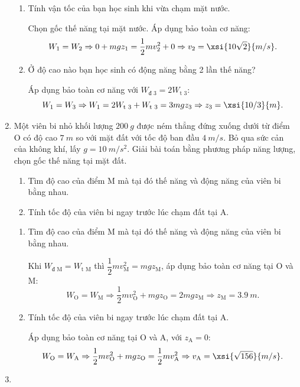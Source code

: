 \begin{enumerate}[label=\bfseries Câu \arabic*:]
	\hideall
	{	
			\begin{enumerate}[label=\alph*)]
			\item Tính vận tốc của bạn học sinh khi vừa chạm mặt nước.
			
			Chọn gốc thế năng tại mặt nước. Áp dụng bảo toàn cơ năng:
			$$W_1 = W_2 \Rightarrow 0 + mgz_1 = \dfrac{1}{2}mv_2^2 + 0 \Rightarrow v_2 = \xsi{10\sqrt 2}{m/s}.$$
			\item Ở độ cao nào bạn học sinh có động năng bằng 2 lần thế năng?
			
			Áp dụng bảo toàn cơ năng với $W_\text{đ 3} = 2 W_\text{t 3}$:
			$$W_1 = W_3 \Rightarrow W_1 = 2W_\text{t 3} + W_\text{t 3} = 3 mgz_3 \Rightarrow z_3 = \xsi{10/3}{m}.$$
		\end{enumerate}
	}
	\item {}
	
	
	{
			Một viên bi nhỏ khối lượng $\SI{200}{g}$ được ném thẳng đứng xuống dưới từ điểm O có độ cao $\SI{7}{m}$ so với mặt đất với tốc độ ban đầu $\SI{4}{m/s}$. Bỏ qua sức cản của không khí, lấy $g=\SI{10}{m/s^2}$. Giải bài toán bằng phương pháp năng lượng, chọn gốc thế năng tại mặt đất.
		\begin{enumerate}[label=\alph*)]
			\item Tìm độ cao của điểm M mà tại đó thế năng và động năng của viên bi bằng nhau.
			\item Tính tốc độ của viên bi ngay trước lúc chạm đất tại A.
		\end{enumerate}
	}
	
	\hideall
	{	
		\begin{enumerate}[label=\alph*)]
			\item Tìm độ cao của điểm M mà tại đó thế năng và động năng của viên bi bằng nhau.
			
			Khi $W_\text{đ M} = W_\text{t M}$ thì $\dfrac{1}{2}mv_\text{M}^2 = mgz_\text{M}$, áp dụng bảo toàn cơ năng tại O và M:
			$$W_\text{O} = W_\text{M} \Rightarrow \dfrac{1}{2}mv_\text{O}^2 + mgz_\text{O} = 2mgz_\text{M} \Rightarrow z_\text{M} = \SI{3.9}{m}.$$
			\item Tính tốc độ của viên bi ngay trước lúc chạm đất tại A.
			
			Áp dụng bảo toàn cơ năng tại O và A, với $z_\text{A} = 0$:
			$$W_\text{O} = W_\text{A} \Rightarrow \dfrac{1}{2}mv_\text{O}^2 + mgz_\text{O} = \dfrac{1}{2}mv_\text{A}^2 \Rightarrow v_\text{A} = \xsi{\sqrt{156}}{m/s}.$$
		\end{enumerate}
	}
	\item {}
	

\end{enumerate}
